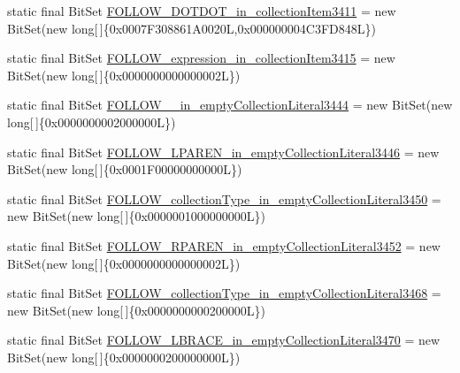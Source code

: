 \begin{DoxyCompactItemize}
\item 
static final Bit\-Set \hyperlink{classorg_1_1tzi_1_1use_1_1parser_1_1shell_1_1_shell_command_parser_a9f06a8bd765cd8c55f4808b58ce70a4c}{F\-O\-L\-L\-O\-W\-\_\-\-D\-O\-T\-D\-O\-T\-\_\-in\-\_\-collection\-Item3411} = new Bit\-Set(new long\mbox{[}$\,$\mbox{]}\{0x0007\-F308861\-A0020\-L,0x000000004\-C3\-F\-D848\-L\})
\item 
static final Bit\-Set \hyperlink{classorg_1_1tzi_1_1use_1_1parser_1_1shell_1_1_shell_command_parser_a45577b873566a0acefd0972e4d471171}{F\-O\-L\-L\-O\-W\-\_\-expression\-\_\-in\-\_\-collection\-Item3415} = new Bit\-Set(new long\mbox{[}$\,$\mbox{]}\{0x0000000000000002\-L\})
\item 
static final Bit\-Set \hyperlink{classorg_1_1tzi_1_1use_1_1parser_1_1shell_1_1_shell_command_parser_a61e19c783b0648ab1806f9fe19945f70}{F\-O\-L\-L\-O\-W\-\_\-\_\-in\-\_\-empty\-Collection\-Literal3444} = new Bit\-Set(new long\mbox{[}$\,$\mbox{]}\{0x0000000002000000\-L\})
\item 
static final Bit\-Set \hyperlink{classorg_1_1tzi_1_1use_1_1parser_1_1shell_1_1_shell_command_parser_a3aacad91a25115e5893426c3d7e7ae8d}{F\-O\-L\-L\-O\-W\-\_\-\-L\-P\-A\-R\-E\-N\-\_\-in\-\_\-empty\-Collection\-Literal3446} = new Bit\-Set(new long\mbox{[}$\,$\mbox{]}\{0x0001\-F00000000000\-L\})
\item 
static final Bit\-Set \hyperlink{classorg_1_1tzi_1_1use_1_1parser_1_1shell_1_1_shell_command_parser_ab6fc91eb6831dc0293fbb19f7bdf9551}{F\-O\-L\-L\-O\-W\-\_\-collection\-Type\-\_\-in\-\_\-empty\-Collection\-Literal3450} = new Bit\-Set(new long\mbox{[}$\,$\mbox{]}\{0x0000001000000000\-L\})
\item 
static final Bit\-Set \hyperlink{classorg_1_1tzi_1_1use_1_1parser_1_1shell_1_1_shell_command_parser_a08b8cdf119cfd3b1261bfc2e093b6254}{F\-O\-L\-L\-O\-W\-\_\-\-R\-P\-A\-R\-E\-N\-\_\-in\-\_\-empty\-Collection\-Literal3452} = new Bit\-Set(new long\mbox{[}$\,$\mbox{]}\{0x0000000000000002\-L\})
\item 
static final Bit\-Set \hyperlink{classorg_1_1tzi_1_1use_1_1parser_1_1shell_1_1_shell_command_parser_a997b3f7e731f545b4c6783fa043259f1}{F\-O\-L\-L\-O\-W\-\_\-collection\-Type\-\_\-in\-\_\-empty\-Collection\-Literal3468} = new Bit\-Set(new long\mbox{[}$\,$\mbox{]}\{0x0000000000200000\-L\})
\item 
static final Bit\-Set \hyperlink{classorg_1_1tzi_1_1use_1_1parser_1_1shell_1_1_shell_command_parser_ab64e349a33cd387853a42b75a80e72e9}{F\-O\-L\-L\-O\-W\-\_\-\-L\-B\-R\-A\-C\-E\-\_\-in\-\_\-empty\-Collection\-Literal3470} = new Bit\-Set(new long\mbox{[}$\,$\mbox{]}\{0x0000000200000000\-L\})

\end{DoxyCompactItemize}
